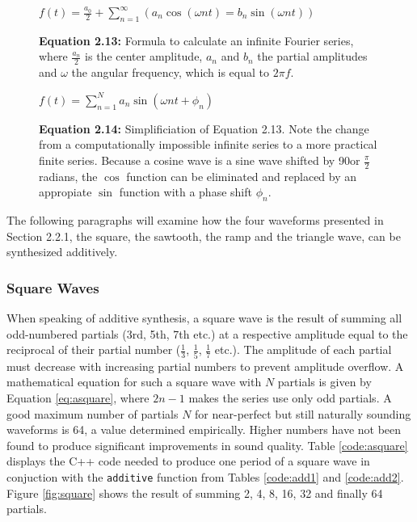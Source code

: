   \begin{figure}[h!]
    $f(t) = \frac{a_{0}}{2} + \sum\limits_{n=1}^\infty (a_{n} \cos(\omega n t) = b_{n} \sin(\omega n t))$
    \caption*{\textbf{Equation 2.13: }Formula to calculate an infinite Fourier series, where $\frac{a_{n}}{2}$ is the center amplitude, $a_{n}$ and $b_{n}$ the partial amplitudes and $\omega$ the angular frequency, which is equal to $2 \pi f$.}
    \label{fig:fourier1}
  \end{figure}

  \begin{figure}[h!]
    $f(t) = \sum\limits_{n=1}^N a_{n} \sin(\omega n t + \phi_{n})$
    \caption*{\textbf{Equation 2.14:} Simplificiation of Equation 2.13. Note the change from a computationally impossible infinite series to a more practical finite series. Because a cosine wave is a sine wave shifted by 90\degree or $\frac{\pi}{2}$ radians, the $\cos$ function can be eliminated and replaced by an appropiate $\sin$ function with a phase shift $\phi_{n}$.}
    \label{fig:fourier2}
  \end{figure}

  \begin{table}
     {}
  \end{table}

  \noindent The following paragraphs will examine how the four waveforms presented in Section 2.2.1, the square, the sawtooth, the ramp and the triangle wave, can be synthesized additively.

  \subsubsection{Square Waves}

  When speaking of additive synthesis, a square wave is the result of summing all odd-numbered partials (3rd, 5th, 7th etc.) at a respective amplitude equal to the reciprocal of their partial number ($\frac{1}{3}$, $\frac{1}{5}$, $\frac{1}{7}$ etc.). The amplitude of each partial must decrease with increasing partial numbers to prevent amplitude overflow. A mathematical equation for such a square wave with $N$ partials is given by Equation \ref{eq:asquare}, where $2n - 1$ makes the series use only odd partials. A good maximum number of partials $N$ for near-perfect but still naturally sounding waveforms is 64, a value determined empirically. Higher numbers have not been found to produce significant improvements in sound quality. Table \ref{code:asquare} displays the C++ code needed to produce one period of a square wave in conjuction with the \texttt{additive} function from Tables \ref{code:add1} and \ref{code:add2}. Figure \ref{fig:square} shows the result of summing 2, 4, 8, 16, 32 and finally 64 partials.

